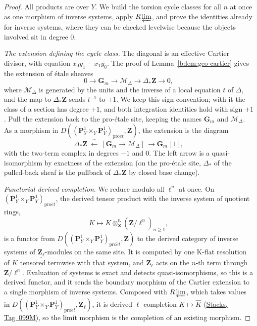 \documentclass[11pt,a4paper]{article}
\numberwithin{equation}{section}
\theoremstyle{definition}
\theoremstyle{remark}
\newcommand{\proet}{\mathrm{pro}\acute{e}t}
\newcommand{\stacks}[1]{\href{https://stacks.math.columbia.edu/tag/#1}{\textnormal{Stacks, Tag~#1}}}
\begin{document}
\begin{proof}
All products are over $Y$. We build the torsion cycle classes for all
$n$ at once as one morphism of inverse systems, apply $R\varprojlim$,
and prove the identities already for inverse systems, where they can be
checked levelwise because the objects involved sit in degree $0$.

\emph{The extension defining the cycle class.} The diagonal is an
effective Cartier divisor, with equation $x_0y_1-x_1y_0$. The proof of
Lemma~\ref{b:lem:geo-cartier} gives the extension of \'etale sheaves
\[
 0\longrightarrow\mathbf G_m\longrightarrow \mathcal M_\Delta
       \longrightarrow\Delta_*\mathbf Z\longrightarrow0,
\]
where $\mathcal M_\Delta$ is generated by the units and the inverse of a
local equation $t$ of $\Delta$, and the map to $\Delta_*\mathbf Z$ sends
$t^{-1}$ to $+1$. We keep this sign convention; with it the class of a
section has degree $+1$, and both integration identities hold with
sign $+1$. Pull the extension back to the pro-\'etale site, keeping the
names $\mathbf G_m$ and $\mathcal M_\Delta$. As a morphism in
$D((\mathbf P^1_Y\times_Y\mathbf P^1_Y)_{\proet},\mathbf Z)$, the
extension is the diagram
\[
 \Delta_*\mathbf Z\ \xleftarrow{\ \sim\ }\
 [\mathbf G_m\longrightarrow \mathcal M_\Delta]\ \longrightarrow \mathbf G_m[1],
\]
with the two-term complex in degrees $-1$ and $0$. The left arrow is a
quasi-isomorphism by exactness of the extension (on the pro-\'etale
site, $\Delta_*$ of the pulled-back sheaf is the pullback of
$\Delta_*\mathbf Z$ by closed base change).

\emph{Functorial derived completion.} We reduce modulo all $\ell^n$ at
once. On $(\mathbf P^1_Y\times_Y\mathbf P^1_Y)_{\proet}$, the derived
tensor product with the inverse system of quotient rings,
\[
 K\longmapsto K\otimes^{\mathbf L}_{\mathbf Z}
                  (\underline{\mathbf Z/\ell^n})_{n\geq1},
\]
is a functor from $D((\mathbf P^1_Y\times_Y\mathbf P^1_Y)_{\proet},\mathbf Z)$ to the
derived category of inverse systems of $\underline{\mathbf Z_\ell}$-modules
on the same site.
It is computed by one K-flat resolution of $K$ tensored termwise with
that system, and $\mathbf Z_\ell$ acts on the $n$-th term through
$\mathbf Z/\ell^n$. Evaluation of systems is exact and detects
quasi-isomorphisms, so this is a derived functor, and it
sends the boundary morphism of the Cartier extension to a single
morphism of inverse systems. Composed with $R\varprojlim$, which takes values in
$D((\mathbf P^1_Y\times_Y\mathbf P^1_Y)_{\proet},\underline{\mathbf Z_\ell})$,
it is derived $\ell$-completion $K\mapsto\widehat K$ (\stacks{099M}), so the
limit morphism is the completion of an existing morphism.


\end{proof}
\end{document}
